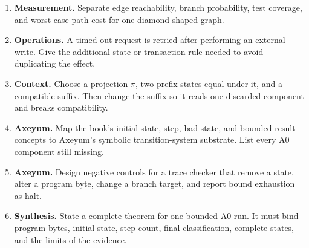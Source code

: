 \begin{enumerate}
\item \textbf{Measurement.} Separate edge reachability, branch probability,
test coverage, and worst-case path cost for one diamond-shaped graph.
\item \textbf{Operations.} A timed-out request is retried after performing an
external write. Give the additional state or transaction rule needed to avoid
duplicating the effect.
\item \textbf{Context.} Choose a projection \(\pi\), two prefix states equal
under it, and a compatible suffix. Then change the suffix so it reads one
discarded component and breaks compatibility.
\item \textbf{Axeyum.} Map the book's initial-state, step, bad-state, and
bounded-result concepts to Axeyum's symbolic transition-system substrate.
List every A0 component still missing.
\item \textbf{Axeyum.} Design negative controls for a trace checker that
remove a state, alter a program byte, change a branch target, and report bound
exhaustion as halt.
\item \textbf{Synthesis.} State a complete theorem for one bounded A0 run. It
must bind program bytes, initial state, step count, final classification,
complete states, and the limits of the evidence.
\end{enumerate}
